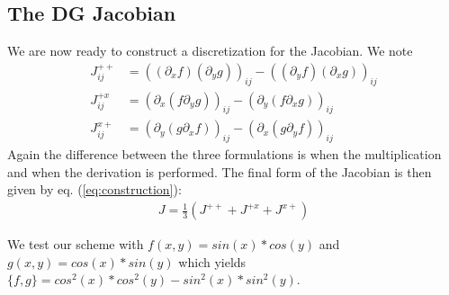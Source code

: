 \documentclass[a4paper,12pt]{scrartcl}
\begin{document}
\subsection{ The DG Jacobian}
We are now ready to construct a discretization for the Jacobian. 
We note 
\begin{subequations}
    \begin{align}
        J^{++}_{ij} &= ((\partial_x f)(\partial_y g))_{ij} - ((\partial_y f)(\partial_x g))_{ij} \\
        J^{+x}_{ij} &= (\partial_x ( f\partial_y g))_{ij} - (\partial_y (f\partial_x g))_{ij} \\
        J^{x+}_{ij} &= (\partial_y (g\partial_x f))_{ij} - (\partial_x( g\partial_y f))_{ij}
        \label{}
    \end{align}
    \label{}
\end{subequations}
Again the difference between the three formulations is when the multiplication
and when the derivation is performed. 
The final form of the Jacobian is then given by eq. (\ref{eq:construction}):
\begin{align}
    J = \frac{1}{3}(J^{++} + J^{+x} + J^{x+})
    \label{}
\end{align}

We test our scheme with $f(x,y) = sin(x)*cos(y)$ and 
$g(x,y) = cos(x)*sin(y)$ which yields 
$\{f,g\} = cos^2(x)*cos^2(y) - sin^2(x)*sin^2(y)$. 
\end{document}
